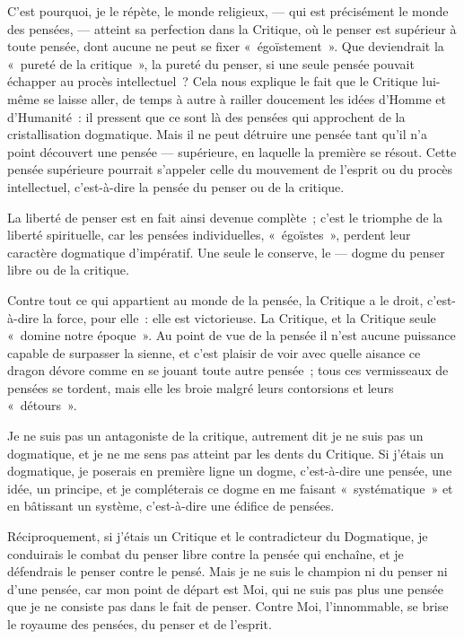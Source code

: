 \documentclass[french,twoside]{book} %
\begin{document}
C’est pourquoi, je le répète, le monde religieux, — qui est précisément le monde des pensées, — atteint  sa perfection dans la Critique, où le penser est supérieur à toute pensée, dont aucune ne peut se fixer « égoïstement ». Que deviendrait la « pureté de la critique », la pureté du penser, si une seule pensée pouvait échapper au procès intellectuel ? Cela nous explique le fait que le Critique lui-même se laisse aller, de temps à autre à railler doucement les idées d’Homme et d’Humanité : il pressent que ce sont là des pensées qui approchent de la cristallisation dogmatique. Mais il ne peut détruire une pensée tant qu’il n’a point découvert une pensée — supérieure, en laquelle la première se résout. Cette pensée supérieure pourrait s’appeler celle du mouvement de l’esprit ou du procès intellectuel, c’est-à-dire la pensée du penser ou de la critique.\par
La liberté de penser est en fait ainsi devenue complète ; c’est le triomphe de la liberté spirituelle, car les pensées individuelles, « égoïstes », perdent leur caractère dogmatique d’impératif. Une seule le conserve, le — dogme du penser libre ou de la critique.\par
Contre tout ce qui appartient au monde de la pensée, la Critique a le droit, c’est-à-dire la force, pour elle : elle est victorieuse. La Critique, et la Critique seule « domine notre époque ». Au point de vue de la pensée il n’est aucune puissance capable de surpasser la sienne, et c’est plaisir de voir avec quelle aisance ce dragon dévore comme en se jouant toute autre pensée ; tous ces vermisseaux de pensées se tordent, mais elle les broie malgré leurs contorsions et leurs « détours ».\par
Je ne suis pas un antagoniste de la critique, autrement dit je ne suis pas un dogmatique, et je ne me sens pas atteint par les dents du Critique. Si j’étais un dogmatique, je poserais en première ligne un dogme, c’est-à-dire une pensée, une idée, un principe, et je compléterais ce dogme en me faisant « systématique » et en bâtissant un système, c’est-à-dire une édifice de pensées.\par
 Réciproquement, si j’étais un Critique et le contradicteur du Dogmatique, je conduirais le combat du penser libre contre la pensée qui enchaîne, et je défendrais le penser contre le pensé. Mais je ne suis le champion ni du penser ni d’une pensée, car mon point de départ est Moi, qui ne suis pas plus une pensée que je ne consiste pas dans le fait de penser. Contre Moi, l’innommable, se brise le royaume des pensées, du penser et de l’esprit.\par
\end{document}
